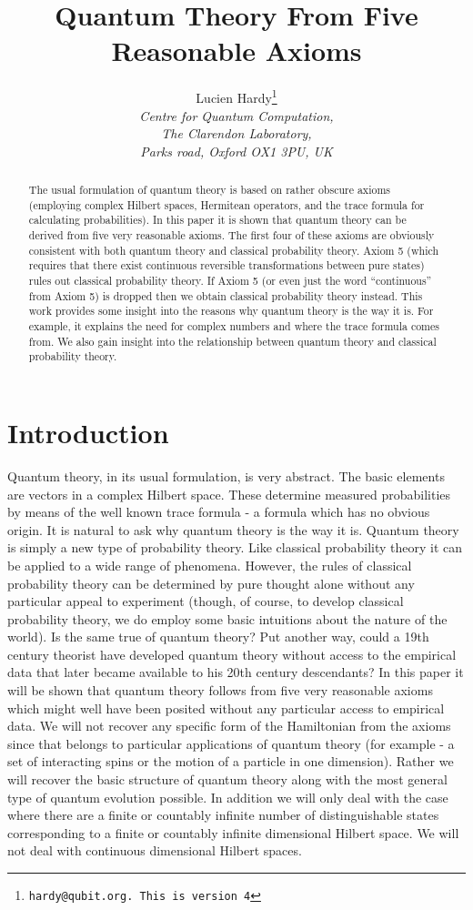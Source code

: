 \documentclass[10pt,twocolumn]{article}
\title{\textbf{Quantum Theory From Five Reasonable Axioms}}
\author{Lucien Hardy\thanks{\texttt{hardy@qubit.org.  This is version
4}}\\
\textit{Centre for Quantum Computation,}\\
\textit{The Clarendon Laboratory,}\\
\textit{Parks road, Oxford OX1 3PU, UK}}
\begin{document}
\maketitle

\begin{abstract}
The usual formulation of quantum theory is based on rather obscure axioms
(employing complex Hilbert spaces, Hermitean operators, and the trace
formula for calculating probabilities).
In this paper it is shown that quantum theory can be derived from five
very reasonable axioms. The first four of these axioms are obviously
consistent with both quantum theory and classical probability theory.
Axiom 5 (which requires that there exist continuous reversible
transformations between pure states) rules out classical probability
theory.  If Axiom 5 (or even just the word ``continuous'' from Axiom 5)
is dropped then we obtain
classical probability theory instead.  This work provides some insight into
the reasons why quantum theory is the way it is.  For example, it explains
the need for complex numbers and where the trace formula comes from.
We also gain insight into the relationship between quantum theory and
classical probability theory.
\end{abstract}




\section{Introduction}

Quantum theory, in its usual formulation, is very abstract.  The basic
elements are vectors in a complex Hilbert space.  These determine
measured probabilities by means of the well known trace formula - a
formula which has no obvious origin.  It is natural to ask
why quantum theory is the way it is.  Quantum theory is simply a new
type of probability theory.  Like classical probability theory it can be
applied to a wide range of phenomena.  However, the rules of classical
probability theory can be determined by pure thought alone without any
particular appeal to experiment (though, of course, to develop
classical probability theory, we do employ some basic intuitions about
the nature of the world).  Is the same true of quantum theory?  Put
another way, could a 19th century theorist have developed quantum theory
without access to the empirical data that later became available to his
20th century descendants? In this paper it will be shown that quantum theory
follows from
five very reasonable axioms which might well have been posited without
any particular access to empirical data.  We will not recover any
specific form of
the Hamiltonian from the axioms since that belongs to particular
applications of quantum theory (for example - a set of interacting spins
or the motion of a particle in one dimension). Rather we will recover
the basic structure of quantum theory along with the most general type
of quantum evolution possible.  In addition we will only deal with the
case where there are a finite or countably infinite number of
distinguishable states corresponding to a finite or countably infinite
dimensional Hilbert space. We will not deal with continuous dimensional
Hilbert spaces.
\end{document}
